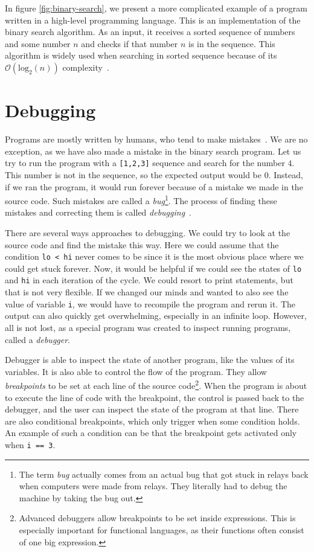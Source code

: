 In figure \ref{fig:binary-search}, we present a more complicated example of a
program written in a high-level programming language. This is an implementation
of the binary search algorithm. As an input, it receives a sorted sequence of
numbers and some number $n$ and checks if that number $n$ is in the sequence.
This algorithm is widely used when searching in sorted sequence because of its
$\mathcal{O}(\text{log}_2(n))$ complexity~\cite{pruvodce}.

\section{Debugging}
Programs are mostly written by humans, who tend to make
mistakes~\cite{human-error}. We are no exception, as we have also made a
mistake in the binary search program. Let us try to run the program with a
\texttt{[1,2,3]} sequence and search for the number $4$. This number is not in
the sequence, so the expected output would be $0$. Instead, if we ran the
program, it would run forever because of a mistake we made in the source code.
Such mistakes are called a \textit{bug}\footnote{The term \textit{bug} actually
comes from an actual bug that got stuck in relays back when computers were made
from relays. They literally had to debug the machine by taking the bug out.}.
The process of finding these mistakes and correcting them is called
\textit{debugging}~\cite{art-of-testing}.

There are several ways approaches to debugging. We could try to look at the
source code and find the mistake this way. Here we could assume that the
condition \texttt{lo < hi} never comes to be since it is the most obvious place
where we could get stuck forever. Now, it would be helpful if we could see the
states of \texttt{lo} and \texttt{hi} in each iteration of the cycle. We could
resort to print statements, but that is not very flexible. If we changed our
minds and wanted to also see the value of variable \texttt{i}, we would have to
recompile the program and rerun it. The output can also quickly get
overwhelming, especially in an infinite loop. However, all is not lost, as a
special program was created to inspect running programs, called a
\textit{debugger}.

Debugger is able to inspect the state of another program, like the values of
its variables. It is also able to control the flow of the program. They allow
\textit{breakpoints} to be set at each line of the source
code\footnote{Advanced debuggers allow breakpoints to be set inside
expressions. This is especially important for functional languages, as their
functions often consist of one big expression.}. When the program is about to
execute the line of code with the breakpoint, the control is passed back to the
debugger, and the user can inspect the state of the program at that line. There
are also conditional breakpoints, which only trigger when some condition holds.
An example of such a condition can be that the breakpoint gets activated only
when \texttt{i == 3}.


